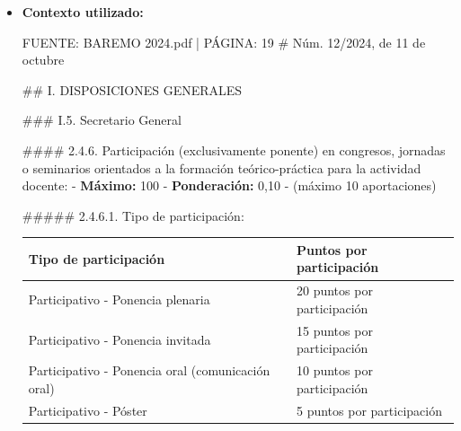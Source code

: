 \documentclass{article}
\begin{document}
\begin{itemize}
\begin{itemize}
                \#\#\# Ponderación del apartado de actividad investigadora:
                - La actividad investigadora tiene una ponderación del \textbf{35\%} en la evaluación global para la plaza de Profesor Ayudante Doctor, según la Tabla 1 de ponderaciones.

                \#\#\# Máximo de puntos en el apartado de actividad investigadora:
                - El máximo de puntos que se puede conseguir en este apartado es \textbf{100 puntos}, considerando todos los criterios de evaluación mencionados.

                En resumen, el máximo de puntos que puedes conseguir en el apartado de actividad investigadora para la plaza de Profesor Ayudante Doctor es \textbf{100 puntos}, distribuidos según los criterios de evaluación y las ponderaciones establecidas en el baremo de 2024.
          \item \textbf{Contexto utilizado:}
                \begin{scriptsize}
                  FUENTE: BAREMO 2024.pdf | PÁGINA: 19
                  \# Núm. 12/2024, de 11 de octubre

                  \#\# I. DISPOSICIONES GENERALES

                  \#\#\# I.5. Secretario General

                  \#\#\#\# 2.4.6. Participación (exclusivamente ponente) en congresos, jornadas o seminarios orientados a la formación teórico-práctica para la actividad docente:
                  - \textbf{Máximo:} 100
                  - \textbf{Ponderación:} 0,10
                  - (máximo 10 aportaciones)

                  \#\#\#\#\# 2.4.6.1. Tipo de participación:
                  \vspace{0.4cm}
                  \begin{table}[h!]\centering\renewcommand{\arraystretch}{1.3}
                    \begin{tabular}{|p{}|p{}|}\hline
                      Tipo de participación                             & Puntos por participación    \\\hline
                      Participativo - Ponencia plenaria                 & 20 puntos por participación \\\hline
                      Participativo - Ponencia invitada                 & 15 puntos por participación \\\hline
                      Participativo - Ponencia oral (comunicación oral) & 10 puntos por participación \\\hline
                      Participativo - Póster                            & 5 puntos por participación  \\\hline
                    \end{tabular}\end{table}
                  \vspace{0.4cm}


\end{scriptsize}
\end{itemize}
\end{itemize}
\end{document}
